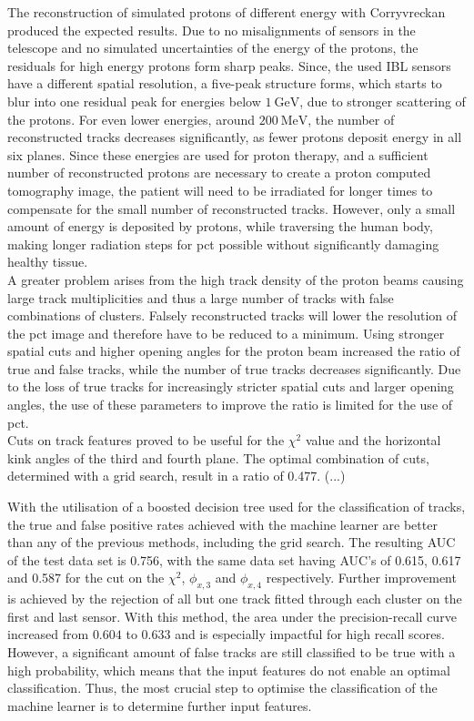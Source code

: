 The reconstruction of simulated protons of different energy with Corryvreckan produced the expected results. Due to no misalignments of sensors in the telescope and no simulated uncertainties
of the energy of the protons, the residuals for high energy protons form sharp peaks. Since, the used IBL sensors have a different spatial resolution, a five-peak structure
forms, which starts to blur into one residual peak for energies below $\SI{1}{\giga\eV}$, due to stronger scattering of the protons. For even lower energies,
around $\SI{200}{\mega\eV}$, the number of reconstructed tracks decreases significantly, as fewer protons deposit energy in all six planes. Since these energies are
used for proton therapy, and a sufficient number of reconstructed protons are necessary to create a proton computed tomography image, the patient
will need to be irradiated for longer times to compensate for the small number of reconstructed tracks. However, only a small amount of energy is deposited by protons, while traversing
the human body, making longer radiation steps for pct possible without significantly damaging healthy tissue. \\
A greater problem arises from the high track density of the proton beams causing large track multiplicities and thus a large number of tracks with false combinations of
clusters. Falsely reconstructed tracks will lower the resolution of the pct image and therefore have to be reduced to a minimum. Using stronger spatial cuts and higher
opening angles for the proton beam increased the ratio of true and false tracks, while the number of true tracks decreases significantly. Due to the loss of
true tracks for increasingly stricter spatial cuts and larger opening angles, the use of these parameters to improve the ratio is limited for the use of pct. \\
Cuts on track features proved to be useful for the $\chi^2$ value and the horizontal kink angles of the third and fourth plane. The optimal combination of cuts, determined
with a grid search, result in a ratio of 0.477. (...)

With the utilisation of a boosted decision tree used for the classification of tracks, the true and false positive rates achieved with the machine learner are better
than any of the previous methods, including the grid search. The resulting AUC of the test data set is 0.756, with the same data set having AUC's of
0.615, 0.617 and 0.587 for the cut on the $\chi^2$, $\phi_{x,3}$ and $\phi_{x,4}$ respectively. Further improvement is achieved by the rejection of all but one track
fitted through each cluster on the first and last sensor. With this method, the area under the precision-recall curve increased from $0.604$ to $0.633$ and is especially
impactful for high recall scores. \\
However, a significant amount of false tracks are still classified to be true
with a high probability, which means that the input features do not enable an optimal classification. Thus, the most crucial step to optimise the classification of the machine learner is
to determine further input features. \\

